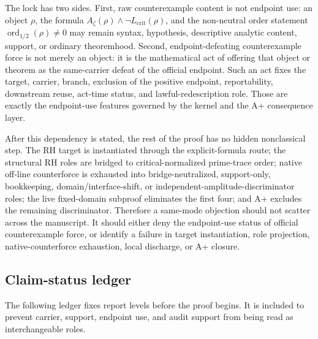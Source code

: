 \documentclass[11pt]{article}
\newcommand{\Az}{A_{\zeta}}
\newcommand{\Lcrit}{L_{\mathrm{crit}}}
\newcommand{\ordhalf}{\operatorname{ord}_{1/2}}
\begin{document}
The lock has two sides.  First, raw counterexample content is not endpoint use: an object \(\rho\), the formula \(\Az(\rho)\wedge\neg\Lcrit(\rho)\), and the non-neutral order statement \(\ordhalf(\rho)\ne0\) may remain syntax, hypothesis, descriptive analytic content, support, or ordinary theoremhood.  Second, endpoint-defeating counterexample force is not merely an object: it is the mathematical act of offering that object or theorem as the same-carrier defeat of the official endpoint.  Such an act fixes the target, carrier, branch, exclusion of the positive endpoint, reportability, downstream reuse, act-time status, and lawful-redescription role.  Those are exactly the endpoint-use features governed by the kernel and the A+ consequence layer.

After this dependency is stated, the rest of the proof has no hidden nonclassical step.  The RH target is instantiated through the explicit-formula route; the structural RH roles are bridged to critical-normalized prime-trace order; native off-line counterforce is exhausted into bridge-neutralized, support-only, bookkeeping, domain/interface-shift, or independent-amplitude-discriminator roles; the live fixed-domain subproof eliminates the first four; and A+ excludes the remaining discriminator.  Therefore a same-mode objection should not scatter across the manuscript.  It should either deny the endpoint-use status of official counterexample force, or identify a failure in target instantiation, role projection, native-counterforce exhaustion, local discharge, or A+ closure.


\subsection*{Claim-status ledger}

The following ledger fixes report levels before the proof begins.  It is included to prevent carrier, support, endpoint use, and audit support from being read as interchangeable roles.
\end{document}
